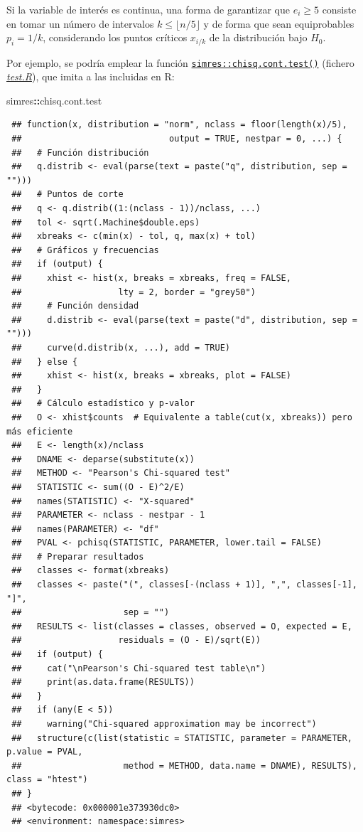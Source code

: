 \documentclass[
  spanish,
  10pt,
]{book}
\newenvironment{Shaded}{\begin{snugshade}}{\end{snugshade}}
\newcommand{\NormalTok}[1]{#1}
\newcommand{\SpecialCharTok}[1]{\textcolor[rgb]{0.81,0.36,0.00}{\textbf{#1}}}
\theoremstyle{break}
\theoremstyle{nonumberplain}
\begin{document}
Si la variable de interés es continua, una forma de garantizar que \(e_{i}\geq5\) consiste en tomar un número de intervalos \(k\leq \lfloor n/5 \rfloor\) y de forma que sean equiprobables \(p_{i}=1/k\),
considerando los puntos críticos \(x_{i/k}\) de la distribución bajo \(H_0\).

Por ejemplo, se podría emplear la función \href{https://rubenfcasal.github.io/simres/reference/chisq.cont.test.html}{\texttt{simres::chisq.cont.test()}} (fichero \href{R/test.R}{\emph{test.R}}), que imita a las incluidas en R:

\begin{Shaded}
\begin{Highlighting}[]
\NormalTok{simres}\SpecialCharTok{::}\NormalTok{chisq.cont.test}
\end{Highlighting}
\end{Shaded}

\begin{verbatim}
 ## function(x, distribution = "norm", nclass = floor(length(x)/5),
 ##                             output = TRUE, nestpar = 0, ...) {
 ##   # Función distribución
 ##   q.distrib <- eval(parse(text = paste("q", distribution, sep = "")))
 ##   # Puntos de corte
 ##   q <- q.distrib((1:(nclass - 1))/nclass, ...)
 ##   tol <- sqrt(.Machine$double.eps)
 ##   xbreaks <- c(min(x) - tol, q, max(x) + tol)
 ##   # Gráficos y frecuencias
 ##   if (output) {
 ##     xhist <- hist(x, breaks = xbreaks, freq = FALSE,
 ##                   lty = 2, border = "grey50")
 ##     # Función densidad
 ##     d.distrib <- eval(parse(text = paste("d", distribution, sep = "")))
 ##     curve(d.distrib(x, ...), add = TRUE)
 ##   } else {
 ##     xhist <- hist(x, breaks = xbreaks, plot = FALSE)
 ##   }
 ##   # Cálculo estadístico y p-valor
 ##   O <- xhist$counts  # Equivalente a table(cut(x, xbreaks)) pero más eficiente
 ##   E <- length(x)/nclass
 ##   DNAME <- deparse(substitute(x))
 ##   METHOD <- "Pearson's Chi-squared test"
 ##   STATISTIC <- sum((O - E)^2/E)
 ##   names(STATISTIC) <- "X-squared"
 ##   PARAMETER <- nclass - nestpar - 1
 ##   names(PARAMETER) <- "df"
 ##   PVAL <- pchisq(STATISTIC, PARAMETER, lower.tail = FALSE)
 ##   # Preparar resultados
 ##   classes <- format(xbreaks)
 ##   classes <- paste("(", classes[-(nclass + 1)], ",", classes[-1], "]",
 ##                    sep = "")
 ##   RESULTS <- list(classes = classes, observed = O, expected = E,
 ##                   residuals = (O - E)/sqrt(E))
 ##   if (output) {
 ##     cat("\nPearson's Chi-squared test table\n")
 ##     print(as.data.frame(RESULTS))
 ##   }
 ##   if (any(E < 5))
 ##     warning("Chi-squared approximation may be incorrect")
 ##   structure(c(list(statistic = STATISTIC, parameter = PARAMETER, p.value = PVAL,
 ##                    method = METHOD, data.name = DNAME), RESULTS), class = "htest")
 ## }
 ## <bytecode: 0x000001e373930dc0>
 ## <environment: namespace:simres>
\end{verbatim}
\end{document}
